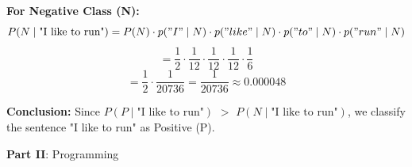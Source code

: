 \documentclass[12pt]{article}
\begin{document}
\begin{enumerate}[leftmargin=\labelsep, label=\textbf{\arabic*.)}]
\begin{itemize}
                    \textbf{For Negative Class (N):}
                    \[
                        P(N \mid \text{"I  like to run"}) = P(N) \cdot p("I" \mid N) \cdot p("like" \mid N) \cdot p("to" \mid N) \cdot p("run" \mid N)
                    \]
                    \[
                        = \frac{1}{2} \cdot \frac{1}{12} \cdot \frac{1}{12} \cdot \frac{1}{12} \cdot \frac{1}{6}
                    \]
                    \[
                        = \frac{1}{2} \cdot \frac{1}{20736} = \frac{1}{20736} \approx 0.000048
                    \]

                    \textbf{Conclusion:}
                    Since \( P(P \mid \text{"I  like to run"}) \) \(>\) \( P(N \mid \text{"I  like to run"}) \), we classify the sentence "I like to run" as Positive (P).

          \end{itemize}
\end{enumerate}
\large{\textbf{Part II}: Programming}\normalsize
\end{document}
